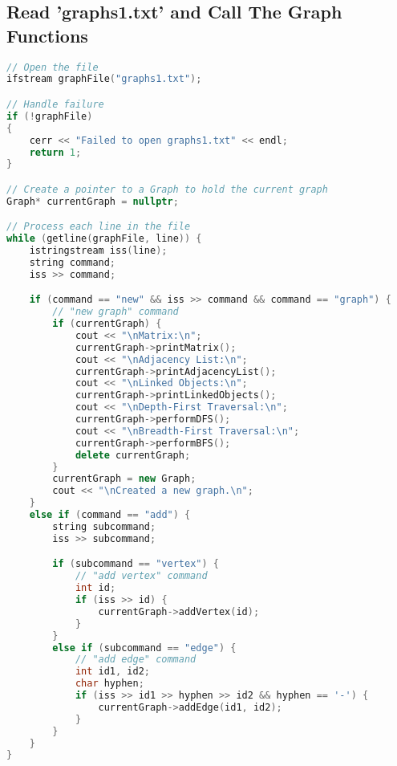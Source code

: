 \documentclass[letterpaper, 10pt,DIV=13]{scrartcl}
\numberwithin{equation}{section} %
\numberwithin{figure}{section} %
\numberwithin{table}{section} %
\begin{document}
\subsection{Read 'graphs1.txt' and Call The Graph Functions}
\begin{linenumbers}
\begin{lstlisting}[language=C++, caption={Read 'graphs1.txt' and Call The Graph Functions}, label={code:example}]
// Open the file
ifstream graphFile("graphs1.txt");

// Handle failure
if (!graphFile)
{
    cerr << "Failed to open graphs1.txt" << endl;
    return 1;
}

// Create a pointer to a Graph to hold the current graph
Graph* currentGraph = nullptr;

// Process each line in the file
while (getline(graphFile, line)) {
    istringstream iss(line);
    string command;
    iss >> command;

    if (command == "new" && iss >> command && command == "graph") {
        // "new graph" command
        if (currentGraph) {
            cout << "\nMatrix:\n";
            currentGraph->printMatrix();
            cout << "\nAdjacency List:\n";
            currentGraph->printAdjacencyList();
            cout << "\nLinked Objects:\n";
            currentGraph->printLinkedObjects();
            cout << "\nDepth-First Traversal:\n";
            currentGraph->performDFS();
            cout << "\nBreadth-First Traversal:\n";
            currentGraph->performBFS();
            delete currentGraph;
        }
        currentGraph = new Graph;
        cout << "\nCreated a new graph.\n";
    }
    else if (command == "add") {
        string subcommand;
        iss >> subcommand;

        if (subcommand == "vertex") {
            // "add vertex" command
            int id;
            if (iss >> id) {
                currentGraph->addVertex(id);
            }
        }
        else if (subcommand == "edge") {
            // "add edge" command
            int id1, id2;
            char hyphen;
            if (iss >> id1 >> hyphen >> id2 && hyphen == '-') {
                currentGraph->addEdge(id1, id2);
            }
        }
    }
}
\end{lstlisting}
\end{linenumbers}
\nolinenumbers
\end{document}
